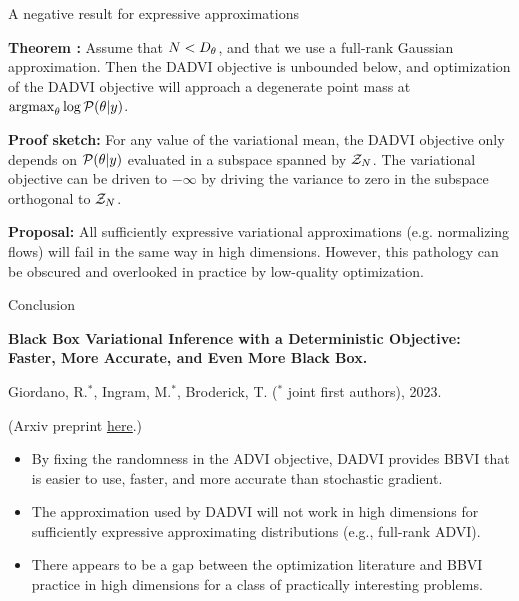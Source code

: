 \documentclass[8pt]{beamer}\usepackage[]{graphicx}\usepackage[]{color}
\begin{document}
\begin{frame}{A negative result for expressive approximations}

\noindent
\textbf{Theorem \citep{giordano:2023:dadvi}:}  Assume that $N < {D_{\theta}}$,
and that we use a full-rank Gaussian approximation.  Then the DADVI objective is
unbounded below, and optimization of the DADVI objective will approach a
degenerate point mass at $\operatorname*{\mathrm{argmax}}_\theta \log \mathcal{P}(\theta \vert y)$.

\pause

\vspace{2em}
\noindent
\textbf{Proof sketch: }For any value of the variational
mean, the DADVI objective only depends on $\mathcal{P}(\theta \vert y)$ evaluated
in a subspace spanned by $\mathcal{Z}_{N}$.  The variational objective can be driven to 
$-\infty$ by driving the variance to zero in the subspace orthogonal to $\mathcal{Z}_{N}$.

\pause

\vspace{2em}
\noindent
\textbf{Proposal: }  All sufficiently expressive variational approximations
(e.g. normalizing flows) will fail in the same way in high dimensions. However,
this pathology can be obscured and overlooked in practice by low-quality
optimization.



\end{frame}




\begin{frame}{Conclusion}


\textbf{Black Box Variational Inference with a Deterministic
Objective: Faster, More Accurate, and Even More Black Box.}

Giordano, R.$^*$, Ingram, M.$^*$, Broderick, T.
($^*$ joint first authors), 2023.

(Arxiv preprint \href{https://arxiv.org/pdf/2304.05527.pdf}{\underline{here}}.)

\vspace{2em}
%
\begin{itemize}
    \item By fixing the randomness in the ADVI objective, DADVI provides 
        BBVI that is easier to use, faster, and more accurate than stochastic gradient.
    \item The approximation used by DADVI will not work in high dimensions
        for sufficiently expressive approximating distributions (e.g., 
        full-rank ADVI).
    \item There appears to be a gap between the optimization literature and 
        BBVI practice in high dimensions for a class of practically interesting
        problems.
\end{itemize}
%



\end{frame}
\end{document}
